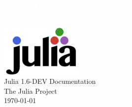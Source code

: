
\begin{titlepage}
\BgThispage

\vspace*{2cm}\noindent
\textcolor{white}{ \MainHeading The Julia Language } 
\\[0.6cm]
\textcolor{white}{
    \SecondaryHeading A fresh approach to technical computing.
}
\vspace*{3cm}\par\noindent


\begin{center}

\includegraphics[width=0.3\textwidth]{logo} 
\\[1.5cm]

{ \SecondaryHeading Julia 1.6-DEV Documentation} 
\\[1.5cm]
{ \huge The Julia Project}
\\[0.5cm]
{ \huge \today }

\end{center} 

\end{titlepage}
\restoregeometry
